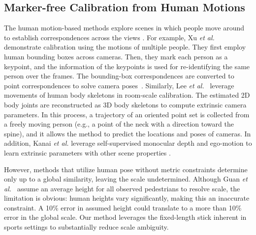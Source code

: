 \documentclass[a4paper, 10pt, conference]{ieeeconf}      %
\newcommand{\eg}{e.g.,\xspace}
\begin{document}
\subsection{Marker-free Calibration from Human Motions} \label{sec:related_work_human_motions}
The human motion-based methods explore scenes in which people move around to establish correspondences across the views \cite{garau2020fast,lee2025spatiotemporal,lee2022extrinsic, patzold2022online,xu2021wide}. For example, Xu \textit{et al.} \cite{xu2021wide} demonstrate calibration using the motions of multiple people. They first employ human bounding boxes across cameras. Then, they mark each person as a keypoint, and the information of the keypoints is used for re-identifying the same person over the frames. The bounding-box correspondences are converted to point correspondences to solve camera poses~\cite{pan2024global}. Similarly, Lee \textit{et al.}~\cite{lee2022extrinsic} leverage movements of human body skeletons in room-scale calibration. The estimated 2D body joints are reconstructed as 3D body skeletons to compute extrinsic camera parameters. In this process, a trajectory of an oriented point set is collected from a freely moving person (\eg a point of the neck with a direction toward the spine), and it allows the method to predict the locations and poses of cameras. In addition, Kanai \textit{et al.} leverage self-supervised monocular depth and ego-motion to learn extrinsic parameters with other scene properties \cite{kanai2023robust}.

However, methods that utilize human pose without metric constraints determine only up to a global similarity, leaving the scale undetermined. Although Guan \textit{et al.}~\cite{chauve2010robust} assume an average height for all observed pedestrians to resolve scale, the limitation is obvious: human heights vary significantly, making this an inaccurate constraint. A 10\% error in assumed height could translate to a more than 10\% error in the global scale. Our method leverages the fixed-length stick inherent in sports settings to substantially reduce scale ambiguity.
\end{document}
